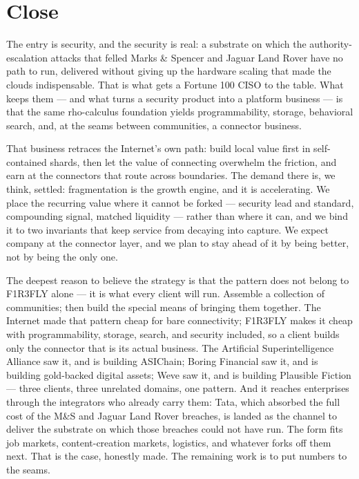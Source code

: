 \documentclass[11pt]{article}
\begin{document}
\section{Close}

The entry is security, and the security is real: a substrate on which the authority-escalation attacks that felled Marks \& Spencer and Jaguar Land Rover have no path to run, delivered without giving up the hardware scaling that made the clouds indispensable. That is what gets a Fortune 100 CISO to the table. What keeps them --- and what turns a security product into a platform business --- is that the same rho-calculus foundation yields programmability, storage, behavioral search, and, at the seams between communities, a connector business.

That business retraces the Internet's own path: build local value first in self-contained shards, then let the value of connecting overwhelm the friction, and earn at the connectors that route across boundaries. The demand there is, we think, settled: fragmentation is the growth engine, and it is accelerating. We place the recurring value where it cannot be forked --- security lead and standard, compounding signal, matched liquidity --- rather than where it can, and we bind it to two invariants that keep service from decaying into capture. We expect company at the connector layer, and we plan to stay ahead of it by being better, not by being the only one.

The deepest reason to believe the strategy is that the pattern does not belong to F1R3FLY alone --- it is what every client will run. Assemble a collection of communities; then build the special means of bringing them together. The Internet made that pattern cheap for bare connectivity; F1R3FLY makes it cheap with programmability, storage, search, and security included, so a client builds only the connector that is its actual business. The Artificial Superintelligence Alliance saw it, and is building ASIChain; Boring Financial saw it, and is building gold-backed digital assets; Weve saw it, and is building Plausible Fiction --- three clients, three unrelated domains, one pattern. And it reaches enterprises through the integrators who already carry them: Tata, which absorbed the full cost of the M\&S and Jaguar Land Rover breaches, is landed as the channel to deliver the substrate on which those breaches could not have run. The form fits job markets, content-creation markets, logistics, and whatever forks off them next. That is the case, honestly made. The remaining work is to put numbers to the seams.
\end{document}
